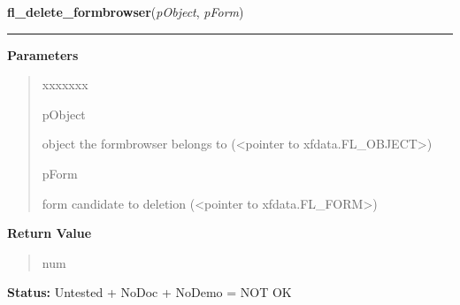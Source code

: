 \hspace{.8\funcindent}\begin{boxedminipage}{\funcwidth}

    \raggedright \textbf{fl\_delete\_formbrowser}(\textit{pObject}, \textit{pForm})

    \vspace{-1.5ex}

    \rule{\textwidth}{0.5\fboxrule}
\setlength{\parskip}{2ex}
\setlength{\parskip}{1ex}
      \textbf{Parameters}
      \vspace{-1ex}

      \begin{quote}
        \begin{Ventry}{xxxxxxx}

          \item[pObject]

          object the formbrowser belongs to ({\textless}pointer to 
          xfdata.FL\_OBJECT{\textgreater})

          \item[pForm]

          form candidate to deletion ({\textless}pointer to 
          xfdata.FL\_FORM{\textgreater})

        \end{Ventry}

      \end{quote}

      \textbf{Return Value}
    \vspace{-1ex}

      \begin{quote}
      num

      \end{quote}

\textbf{Status:} Untested + NoDoc + NoDemo = NOT OK



    \end{boxedminipage}

    \label{xformslib:library:fl_replace_formbrowser}

    \vspace{0.5ex}

